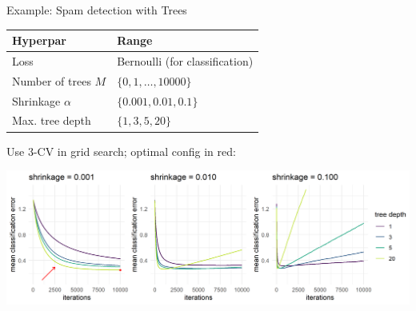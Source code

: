 \begin{vbframe}{Example: Spam detection with Trees} 







%


\begin{table}[]
\footnotesize
\centering
\begin{tabular}{l|l}
Hyperpar     & Range                         \\
\hline
Loss        & Bernoulli (for classification) \\
Number of trees $M$ & $\{0, 1,\dots,10000\}$              \\
Shrinkage $\alpha$     & $\{0.001, 0.01, 0.1\}$           \\
Max. tree depth     & $\{1, 3, 5, 20\}$
\end{tabular}
\end{table}

\vfill
Use 3-CV in grid search; optimal config in red:




\begin{center}
\includegraphics[width=\textwidth]{figure/gbm_spam.png}
\end{center}


\end{vbframe}
